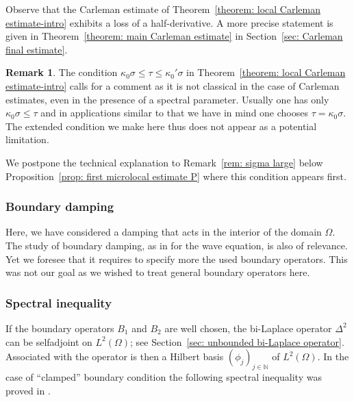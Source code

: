 \documentclass[JEP,XML,SOM,Unicode,published]{cedram}
\theoremstyle{plain}
\theoremstyle{definition}
\newtheorem{remark}[theorem]{Remark}
\def\N{\mathbb{N}}
\let\k\kappa
\begin{document}
Observe that the Carleman estimate of Theorem~\ref{theorem: local
Carleman estimate-intro} exhibits a loss of a half-derivative. A
more precise statement is given in Theorem~\ref{theorem: main Carleman estimate} in Section~\ref{sec: Carleman final estimate}.

\begin{remark}
The condition $\k_0 \sigma \leq \tau \leq \k_0' \sigma$ in
Theorem~\ref{theorem: local Carleman estimate-intro} calls for a
comment as it is not classical in the case of Carleman estimates,
even in the presence of a spectral parameter. Usually one has only
$\k_0 \sigma \leq \tau$ and in applications similar to that we have
in mind one chooses $\tau = \k_0 \sigma$. The extended condition we
make here thus does not appear as a potential limitation.

We postpone the technical explanation to
Remark~\ref{rem: sigma large} below Proposition~\ref{prop: first microlocal estimate
P} where this condition appears first.
\end{remark}


\subsubsection{Boundary damping}
Here, we have considered a damping that acts in the interior of the
domain $\Omega$. The study of boundary damping, as in \cite{LR:97} for
the wave equation, is also of relevance.
Yet we foresee that it requires to specify more the used boundary
operators. This was not our goal as we wished to treat general
boundary operators here.

\subsubsection{Spectral inequality}
If the boundary operators $B_1$ and $B_2$ are well chosen, the
bi-Laplace operator $\Delta^2$ can be selfadjoint on $L^2(\Omega)$;
see Section~\ref{sec: unbounded bi-Laplace operator}. Associated with
the operator is then a Hilbert basis $(\phi_j)_{j \in \N}$ of
$L^2(\Omega)$. In the case of ``clamped'' boundary condition the
following spectral inequality was proved in \cite{JL}.
\end{document}
